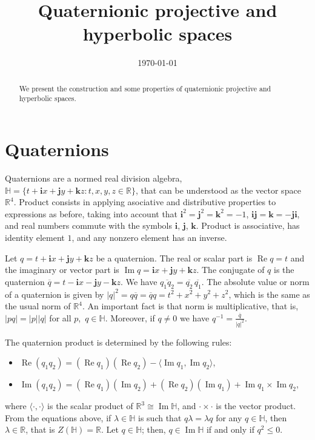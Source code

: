 \documentclass[12pt, a4paper,draft]{amsart}
\newcommand{\R}{\mathbb{R}}
\renewcommand{\H}{\mathbb{H}}
\renewcommand{\Re}{\operatorname{Re}}
\renewcommand{\Im}{\operatorname{Im}}
\theoremstyle{remark}
\begin{document}
\title{Quaternionic projective and hyperbolic spaces}

\begin{abstract}
We present the construction and some properties of quaternionic projective and hyperbolic spaces.
\end{abstract}

\date{\today}
\maketitle

\section{Quaternions}

Quaternions are a normed real division algebra,  
{$\H=\{t+\mathbf{i}x+\mathbf{j}y+\mathbf{k}z:t,x,y,z\in\R\}$}, that can be understood as the vector space $\R^4$. 
Product consists in applying asociative and distributive properties to expressions as before, 
taking into account that $\mathbf{i}^2=\mathbf{j}^2=\mathbf{k}^2=-1$, $\mathbf{i}\mathbf{j}=\mathbf{k}=-\mathbf{j}\mathbf{i}$, and real numbers commute with the symbols 
$\mathbf{i}$, $\mathbf{j}$, $\mathbf{k}$. 
Product is associative, has identity element $1$, and any nonzero element has an inverse.

Let $q=t+\mathbf{i}x+\mathbf{j}y+\mathbf{k}z$ be a quaternion. 
The real or scalar part is $\Re{q}=t$ and the imaginary or vector part is 
$\Im{q}=\mathbf{i}x+\mathbf{j}y+\mathbf{k}z$. 
The {conjugate} of $q$ is the quaternion $\overline{q}=t-\mathbf{i}x-\mathbf{j}y-\mathbf{k}z$. 
We have $\overline{q_1 q_2}=\overline{q_2}\,\overline{q_1}$. 
The absolute value or norm of a quaternion is given by
$\lvert q\rvert^2=q\overline{q}=\overline{q}q=t^2+x^2+y^2+z^2$, 
which is the same as the usual norm of $\R^4$. 
An important fact is that norm is multiplicative, that is,
$\lvert pq\rvert=\lvert p\rvert\lvert q\rvert$ for all $p$,~$q\in\H$. 
Moreover, if $q\neq 0$ we have $q^{-1}=\frac{\overline{q}}{\lvert q\rvert^2}$.

The quaternion product is determined by the following rules:
\begin{itemize}
\item $\Re{(q_1 q_2)}=(\Re{q_1})(\Re{q_2})-\langle \Im{q_1},\Im{q_2}\rangle$,
\item $\Im{(q_1 q_2)}=(\Re{q_1})(\Im{q_2})+(\Re{q_2})(\Im{q_1})+\Im{q_1}\times\Im{q_2}$,
\end{itemize}
where $\langle\cdot,\cdot\rangle$ is the scalar product of $\R^3\cong\Im\H$, 
and $\cdot\times\cdot$ is the vector product. 
From the equations above, if $\lambda\in\H$ is such that $q\lambda=\lambda q$ for any $q\in\H$, then $\lambda\in\R$, that is $Z(\H)=\R$.
Let $q\in\H$; then, $q\in\Im\H$ if and only if $q^2\leq 0$.
\end{document}
